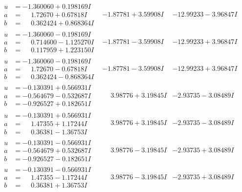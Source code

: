 \documentclass[1p]{elsarticle_modified}
\theoremstyle{definition}
\begin{document}
$$\begin{array}{c|c|c}
\begin{aligned}
u &= -1.360060 + 0.198169 I \\
a &= \phantom{-}1.72670 + 0.67818 I \\
b &= \phantom{-}0.362424 + 0.868364 I\end{aligned}
 & -1.87781 + 3.59908 I & -12.99233 - 3.96847 I \\ \hline\begin{aligned}
u &= -1.360060 - 0.198169 I \\
a &= \phantom{-}0.714600 - 1.125270 I \\
b &= \phantom{-}0.117959 + 1.223150 I\end{aligned}
 & -1.87781 - 3.59908 I & -12.99233 + 3.96847 I \\ \hline\begin{aligned}
u &= -1.360060 - 0.198169 I \\
a &= \phantom{-}1.72670 - 0.67818 I \\
b &= \phantom{-}0.362424 - 0.868364 I\end{aligned}
 & -1.87781 - 3.59908 I & -12.99233 + 3.96847 I \\ \hline\begin{aligned}
u &= -0.130391 + 0.566931 I \\
a &= -0.564679 - 0.532687 I \\
b &= -0.926527 + 0.182651 I\end{aligned}
 & \phantom{-}3.98776 + 3.19845 I & -2.93735 - 3.08489 I \\ \hline\begin{aligned}
u &= -0.130391 + 0.566931 I \\
a &= \phantom{-}1.47355 + 1.17244 I \\
b &= \phantom{-}0.36381 - 1.36753 I\end{aligned}
 & \phantom{-}3.98776 + 3.19845 I & -2.93735 - 3.08489 I \\ \hline\begin{aligned}
u &= -0.130391 - 0.566931 I \\
a &= -0.564679 + 0.532687 I \\
b &= -0.926527 - 0.182651 I\end{aligned}
 & \phantom{-}3.98776 - 3.19845 I & -2.93735 + 3.08489 I \\ \hline\begin{aligned}
u &= -0.130391 - 0.566931 I \\
a &= \phantom{-}1.47355 - 1.17244 I \\
b &= \phantom{-}0.36381 + 1.36753 I\end{aligned}
 & \phantom{-}3.98776 - 3.19845 I & -2.93735 + 3.08489 I\\

\end{array}$$
\end{document}
